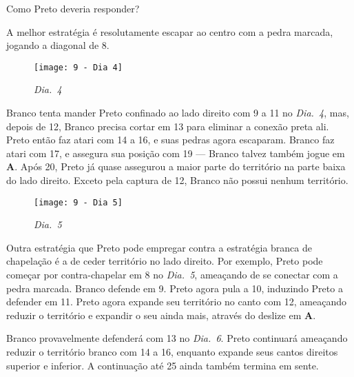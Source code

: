Como Preto deveria responder?

A melhor estratégia é resolutamente escapar ao centro com a pedra marcada, jogando a diagonal de 8.

\begin{wrapfigure}{l}{60mm}
    \vspace{-22.5pt}
    \begin{center}
        \texttt{[image: 9 - Dia 4]}
        \captionsetup{justification=centering}
        \caption*{\emph{Dia.\@~4}}
    \end{center}
    \vspace{-20pt}
\end{wrapfigure}

Branco tenta mander Preto confinado ao lado direito com 9 a 11 no \emph{Dia.\@~4}, mas, depois de 12, Branco precisa cortar em 13 para eliminar a conexão preta ali. Preto então faz atari com 14 a 16, e suas pedras agora escaparam. Branco faz atari com 17, e assegura sua posição com 19 --- Branco talvez também jogue em \textbf{A}. Após 20, Preto já quase assegurou a maior parte do território na parte baixa do lado direito. Exceto pela captura de 12, Branco não possui nenhum território.

\pagebreak

\begin{wrapfigure}{r}{60mm}
    \vspace{-17.5pt}
    \begin{center}
        \texttt{[image: 9 - Dia 5]}
        \captionsetup{justification=centering}
        \caption*{\emph{Dia.\@~5}}
    \end{center}
    \vspace{-37.5pt}
\end{wrapfigure}

Outra estratégia que Preto pode empregar contra a estratégia branca de chapelação é a de ceder território no lado direito. Por exemplo, Preto pode começar por contra-chapelar em 8 no \emph{Dia.\@~5}, ameaçando de se conectar com a pedra marcada. Branco defende em 9. Preto agora pula a 10, induzindo Preto a defender em 11. Preto agora expande seu território no canto com 12, ameaçando reduzir o território e expandir o seu ainda mais, através do deslize em \textbf{A}.

Branco provavelmente defenderá com 13 no \emph{Dia.\@~6}. Preto continuará ameaçando reduzir o território branco com 14 a 16, enquanto expande seus cantos direitos superior e inferior. A continuação até 25 ainda também termina em sente.

